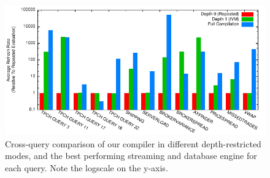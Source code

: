 
\newcommand{\figurewidth}[0]{2.2in}

\begin{figure}
\begin{center}
\includegraphics[width=\textwidth]{../graphs/graphs/bakeoff.pdf}
\caption{Cross-query comparison of our compiler in different depth-restricted modes, and the best performing streaming and database engine for each query.  Note the logscale on the y-axis.}
\label{fig:experiments:bakeoff}
\end{center}
\end{figure}

